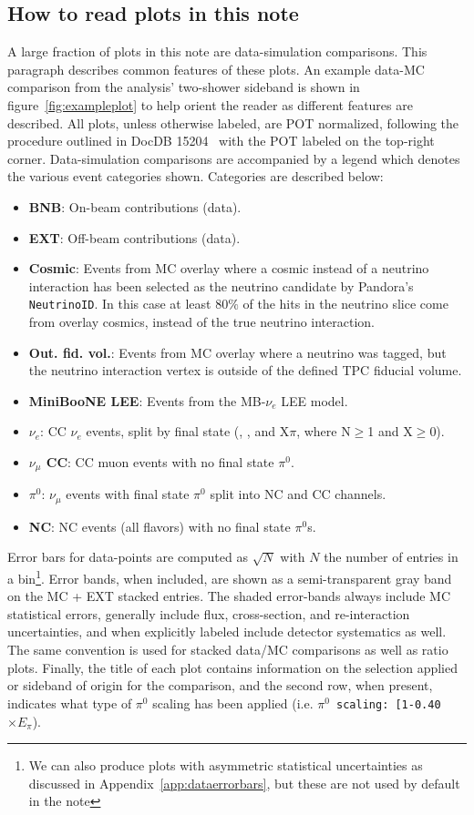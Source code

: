 \subsection{How to read plots in this note} A large fraction of plots in this note are data-simulation comparisons. This paragraph describes common features of these plots. An example data-MC comparison from the analysis' two-shower sideband is shown in figure~\ref{fig:exampleplot} to help orient the reader as different features are described. All plots, unless otherwise labeled, are POT normalized, following the procedure outlined in DocDB 15204~\cite{bib:POTscaling} with the POT labeled on the top-right corner. Data-simulation comparisons are accompanied by a legend which denotes the various event categories shown. Categories are described below:
\begin{itemize}
    \item \textbf{BNB}: On-beam contributions (data).
    \item \textbf{EXT}: Off-beam contributions (data).
    \item \textbf{Cosmic}: Events from MC overlay where a cosmic instead of a neutrino interaction has been selected as the neutrino candidate by Pandora's \texttt{NeutrinoID}. In this case at least $80\%$ of the hits in the neutrino slice come from overlay cosmics, instead of the true neutrino interaction. 
    \item \textbf{Out. fid. vol.}: Events from MC overlay where a neutrino was tagged, but the neutrino interaction vertex is outside of the defined TPC fiducial volume.
    \item \textbf{MiniBooNE LEE}: Events from the MB-$\nu_e$ LEE model.
    \item \textbf{$\nu_e$}: CC $\nu_e$ events, split by final state (\zpsel, \npsel, and X$\pi$, where N$\geq$1 and X$\geq$0).
    \item \textbf{$\nu_{\mu}$ CC}: CC muon events with no final state $\pi^0$.
    \item \textbf{$\pi^0$}: $\nu_{\mu}$ events with final state $\pi^0$ split into NC and CC channels.
    \item \textbf{NC}: NC events (all flavors) with no final state $\pi^0$s.
\end{itemize}{}

Error bars for data-points are computed as $\sqrt{N}$ with $N$ the number of entries in a bin\footnote{We can also produce plots with asymmetric statistical uncertainties as discussed in Appendix~\ref{app:dataerrorbars}, but these are not used by default in the note}. Error bands, when included, are shown as a semi-transparent gray band on the MC + EXT stacked entries. The shaded error-bands always include MC statistical errors, generally include flux, cross-section, and re-interaction uncertainties, and when explicitly labeled include detector systematics as well. The same convention is used for stacked data/MC comparisons as well as ratio plots. Finally, the title of each plot contains information on the selection applied or sideband of origin for the comparison, and the second row, when present, indicates what type of $\pi^0$ scaling has been applied (i.e. \texttt{$\pi^0$ scaling: [1-0.40 $\times E_{\pi}$}).


